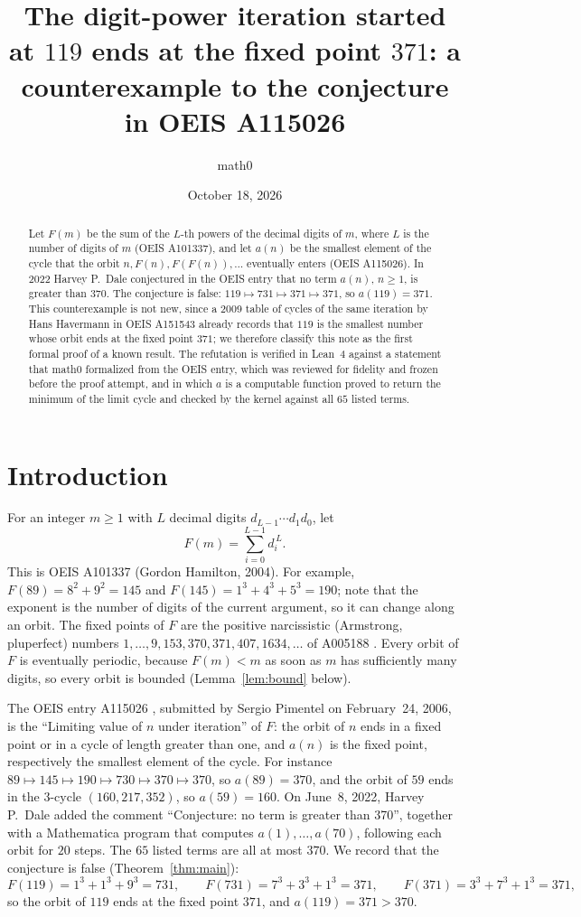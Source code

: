 \documentclass[11pt]{amsart}
\title[The digit-power iteration from 119 ends at 371 (OEIS A115026)]{The digit-power iteration started at $119$ ends at the fixed point $371$: a counterexample to the conjecture in OEIS A115026}
\author{math0}
\date{October 18, 2026}
\theoremstyle{plain}
\theoremstyle{definition}
\begin{document}
\begin{abstract}
Let $F(m)$ be the sum of the $L$-th powers of the decimal digits of $m$, where $L$ is the number of digits of $m$ (OEIS A101337), and let $a(n)$ be the smallest element of the cycle that the orbit $n,F(n),F(F(n)),\dots$ eventually enters (OEIS A115026).
In 2022 Harvey P.~Dale conjectured in the OEIS entry that no term $a(n)$, $n\ge1$, is greater than $370$.
The conjecture is false: $119\mapsto731\mapsto371\mapsto371$, so $a(119)=371$.
This counterexample is not new, since a 2009 table of cycles of the same iteration by Hans Havermann in OEIS A151543 already records that $119$ is the smallest number whose orbit ends at the fixed point $371$; we therefore classify this note as the first formal proof of a known result.
The refutation is verified in Lean~4 against a statement that math0 formalized from the OEIS entry, which was reviewed for fidelity and frozen before the proof attempt, and in which $a$ is a computable function proved to return the minimum of the limit cycle and checked by the kernel against all $65$ listed terms.
\end{abstract}
\maketitle

\section{Introduction}

For an integer $m\ge1$ with $L$ decimal digits $d_{L-1}\cdots d_1d_0$, let
\[
  F(m)=\sum_{i=0}^{L-1} d_i^{\,L}.
\]
This is OEIS A101337 \cite{A101337} (Gordon Hamilton, 2004). For example, $F(89)=8^2+9^2=145$ and $F(145)=1^3+4^3+5^3=190$; note that the exponent is the number of digits of the current argument, so it can change along an orbit.
The fixed points of $F$ are the positive narcissistic (Armstrong, pluperfect) numbers $1,\dots,9,153,370,371,407,1634,\dots$ of A005188 \cite{A005188}.
Every orbit of $F$ is eventually periodic, because $F(m)<m$ as soon as $m$ has sufficiently many digits, so every orbit is bounded (Lemma~\ref{lem:bound} below).

The OEIS entry A115026 \cite{A115026}, submitted by Sergio Pimentel on February~24, 2006, is the ``Limiting value of $n$ under iteration'' of $F$: the orbit of $n$ ends in a fixed point or in a cycle of length greater than one, and $a(n)$ is the fixed point, respectively the smallest element of the cycle.
For instance $89\mapsto145\mapsto190\mapsto730\mapsto370\mapsto370$, so $a(89)=370$, and the orbit of $59$ ends in the $3$-cycle $(160,217,352)$, so $a(59)=160$.
On June~8, 2022, Harvey P.~Dale added the comment ``Conjecture: no term is greater than 370'', together with a Mathematica program that computes $a(1),\dots,a(70)$, following each orbit for $20$ steps.
The $65$ listed terms are all at most $370$.
We record that the conjecture is false (Theorem~\ref{thm:main}):
\[
  F(119)=1^3+1^3+9^3=731,\qquad F(731)=7^3+3^3+1^3=371,\qquad F(371)=3^3+7^3+1^3=371,
\]
so the orbit of $119$ ends at the fixed point $371$, and $a(119)=371>370$.
\end{document}
